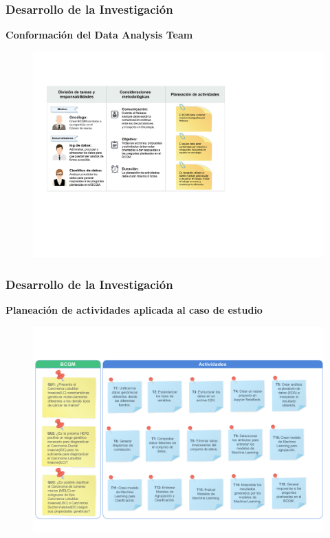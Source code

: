 \documentclass[xcolor=dvipsnames,xcolor=table,10pt]{beamer} %
\begin{document}
\begin{frame}
	\frametitle{Desarrollo de la Investigación}{\textbf{Conformación del Data Analysis Team}}
	\begin{figure}[h!]
		\centering
		\includegraphics[width=0.86\linewidth]{IMAGENES/Activity_Planning}
	\end{figure}
\end{frame}	

\begin{frame}
	\frametitle{Desarrollo de la Investigación}{\textbf{Planeación de actividades aplicada al caso de estudio}}
	\begin{figure}[h!]
		\centering
		\includegraphics[width=0.87\linewidth]{IMAGENES/Planning_TCGA}
	\end{figure}
\end{frame}	
\end{document}

